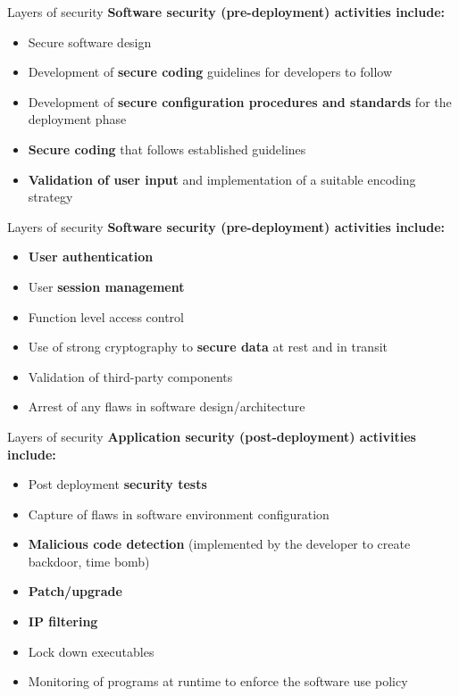 \documentclass[pdf]{beamer}
\begin{document}
\begin{frame}{Layers of security}
\textbf{Software security (pre-deployment) activities include:}
\begin{itemize}
\item
Secure software design
\item
Development of \textbf{secure coding} guidelines for developers to follow
\item
Development of \textbf{secure configuration procedures and standards} for the deployment phase
\item
\textbf{Secure coding} that follows established guidelines
\item
\textbf{Validation of user input} and implementation of a suitable encoding strategy
\end{itemize}
\end{frame}



\begin{frame}{Layers of security}
\textbf{Software security (pre-deployment) activities include:}
\begin{itemize}
\item
\textbf{User authentication}
\item
User \textbf{session management}
\item
Function level access control
\item
Use of strong cryptography to \textbf{secure data} at rest and in transit
\item
Validation of third-party components
\item
Arrest of any flaws in software design/architecture
\end{itemize}
\end{frame}



\begin{frame}{Layers of security}
\textbf{Application security (post-deployment) activities include:}
\begin{itemize}
\item
Post deployment \textbf{security tests}
\item
Capture of flaws in software environment configuration
\item
\textbf{Malicious code detection} (implemented by the developer to create backdoor, time bomb)
\item
\textbf{Patch/upgrade}
\item
\textbf{IP filtering}
\item
Lock down executables
\item
Monitoring of programs at runtime to enforce the software use policy
\end{itemize}
\end{frame}
\end{document}
